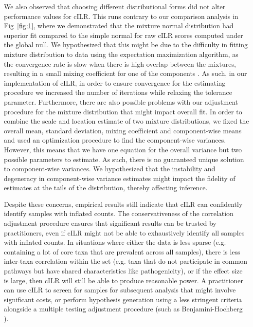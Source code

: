 \documentclass[10pt,letterpaper]{article}
\begin{document}
We also observed that choosing different distributional forms did not alter performance values for cILR. This runs contrary to our comparison analysis in Fig~\ref{fig:1}, where we demonstrated that the mixture normal distribution had superior fit compared to the simple normal for raw cILR scores computed under the global null. We hypothesized that this might be due to the difficulty in fitting mixture distribution to data using the expectation maximization algorithm, as the convergence rate is slow when there is high overlap between the mixtures, resulting in a small mixing coefficient for one of the components \cite{naim2012}. As such, in our implementation of cILR, in order to ensure convergence for the estimating procedure we increased the number of iterations while relaxing the tolerance parameter. Furthermore, there are also possible problems with our adjustment procedure for the mixture distribution that might impact overall fit. In order to combine the scale and location estimate of two mixture distributions, we fixed the overall mean, standard deviation, mixing coefficient and component-wise means and used an optimization procedure to find the component-wise variances. However, this means that we have one equation for the overall variance but two possible parameters to estimate. As such, there is no guaranteed unique solution to component-wise variances. We hypothesized that the instability and degeneracy in component-wise variance estimates might impact the fidelity of estimates at the tails of the distribution, thereby affecting inference.  

Despite these concerns, empirical results still indicate that cILR can confidently identify samples with inflated counts. The conservativeness of the correlation adjustment procedure ensures that significant results can be trusted by practitioners, even if cILR might not be able to exhaustively identify all samples with inflated counts. In situations where either the data is less sparse (e.g. containing a lot of core taxa that are prevalent across all samples), there is less inter-taxa correlation within the set (e.g. taxa that do not participate in common pathways but have shared characteristics like pathogenicity), or if the effect size is large, then cILR will still be able to produce reasonable power. A practitioner can use cILR to screen for samples for subsequent analysis that might involve significant costs, or perform hypothesis generation using a less stringent criteria alongside a multiple testing adjustment procedure (such as Benjamini-Hochberg \cite{benjamini1995}). 
\end{document}

